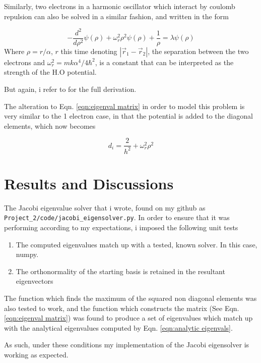 \documentclass[10pt,showpacs,preprintnumbers,footinbib,amsmath,amssymb,aps,prl,twocolumn,groupedaddress,superscriptaddress,showkeys]{revtex4-1}
\begin{document}
    Similarly, two electrons in a harmonic oscillator which interact by coulomb repulsion can also be solved in a similar fashion, and written in the form

    \begin{equation}
      \label{eqn:2electron_para}
      -\frac{d^2}{d\rho^2} \psi(\rho) + \omega_r^2 \rho^2 \psi(\rho) + \frac{1}{\rho} = \lambda \psi(\rho)
    \end{equation}
    Where $\rho=r/\alpha$, $r$ this time denoting $|\vec r_1 - \vec r_2|$, the separation between the two electrons 
    and $\omega_r^2=mk\alpha^4/4\hbar^2$, is a constant that can be interpreted as the strength of the H.O potential.

    But again, i refer to \cite{question_text} for the full derivation.

    The alteration to Eqn. \ref{eqn:eigenval matrix} in order to model this problem is very similar to the 1 electron case, in that the potential is added to the diagonal elements, which now becomes

    \begin{equation}
      d_i = \frac{2}{h^2} + \omega_r^2 \rho^2
    \end{equation}
\section{Results and Discussions}
  The Jacobi eigenvalue solver that i wrote, found on my github as \lstinline{Project_2/code/jacobi_eigensolver.py}.
  In order to ensure that it was performing according to my expectations, i imposed the following unit tests
  \begin{enumerate}
    \item The computed eigenvalues match up with a tested, known solver. In this case, numpy.
    \item The orthonormality of the starting basis is retained in the resultant eigenvectors
  \end{enumerate}

  The function which finds the maximum of the squared non diagonal elements was also tested to work, and the function which constructs the matrix (See Eqn. \ref{eqn:eigenval matrix}) was found to produce a set of eigenvalues which match up with the analytical eigenvalues computed by Eqn. \ref{eqn:analytic eigenvals}.

  As such, under these conditions my implementation of the Jacobi eigensolver is working as expected.
\end{document}
